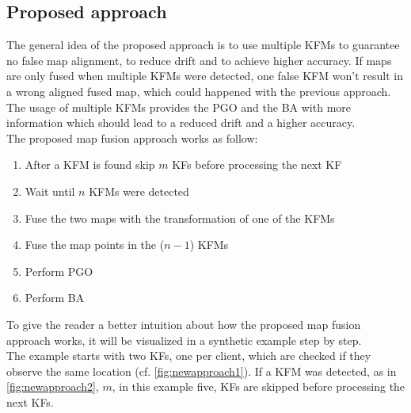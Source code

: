 \subsection{Proposed approach}
The general idea of the proposed approach is to use multiple \acp{KFM} to guarantee no false map alignment, to reduce drift and to achieve higher accuracy. If maps are only fused when multiple \acp{KFM} were detected, one false \ac{KFM} won't result in a wrong aligned fused map, which could happened with the previous approach. The usage of multiple \acp{KFM} provides the \ac{PGO} and the \ac{BA} with more information which should lead to a reduced drift and a higher accuracy.\\

The proposed map fusion approach works as follow:

\begin{enumerate}
  \item After a \ac{KFM} is found skip $m$ \acp{KF} before processing the next \acs{KF}
  \item Wait until $n$ \acp{KFM} were detected
  \item Fuse the two maps with the transformation of one of the \acp{KFM}
  \item Fuse the map points in the ($n-1$) \acp{KFM}
  \item Perform \ac{PGO}
  \item Perform \ac{BA}
\end{enumerate}

To give the reader a better intuition about how the proposed map fusion approach works, it will be visualized in a synthetic example step by step.\\
The example starts with two \acp{KF}, one per client, which are checked if they observe the same location (cf. \autoref{fig:newapproach1}). If a \ac{KFM} was detected, as in \autoref{fig:newapproach2}, $m$, in this example five, \acp{KF} are skipped before processing the next \acp{KF}.

